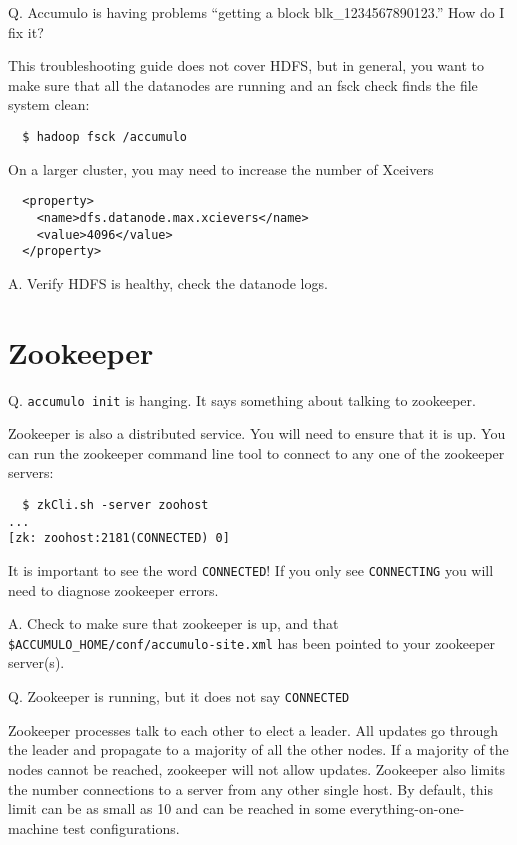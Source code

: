 Q. Accumulo is having problems ``getting a block blk\_1234567890123.'' How do I fix it?

This troubleshooting guide does not cover HDFS, but in general, you
want to make sure that all the datanodes are running and an fsck check
finds the file system clean:

\small
\begin{verbatim}
  $ hadoop fsck /accumulo
\end{verbatim}
\normalsize

On a larger cluster, you may need to increase the number of Xceivers

\small
\begin{verbatim}
  <property>
    <name>dfs.datanode.max.xcievers</name>
    <value>4096</value>
  </property>
\end{verbatim}
\normalsize

A. Verify HDFS is healthy, check the datanode logs.

\section{Zookeeper}

Q. \texttt{accumulo init} is hanging.  It says something about talking to zookeeper.

Zookeeper is also a distributed service.  You will need to ensure that
it is up.  You can run the zookeeper command line tool to connect to
any one of the zookeeper servers:

\small
\begin{verbatim}
  $ zkCli.sh -server zoohost
...
[zk: zoohost:2181(CONNECTED) 0] 
\end{verbatim}
\normalsize

It is important to see the word \texttt{CONNECTED}!  If you only see
\texttt{CONNECTING} you will need to diagnose zookeeper errors.

A. Check to make sure that zookeeper is up, and that
\texttt{\$ACCUMULO\_HOME/conf/accumulo-site.xml} has been pointed to
your zookeeper server(s).

Q. Zookeeper is running, but it does not say \texttt{CONNECTED}

Zookeeper processes talk to each other to elect a leader.  All updates
go through the leader and propagate to a majority of all the other
nodes.  If a majority of the nodes cannot be reached, zookeeper will
not allow updates.  Zookeeper also limits the number connections to a
server from any other single host.  By default, this limit can be as small as 10 
and can be reached in some everything-on-one-machine test configurations.


